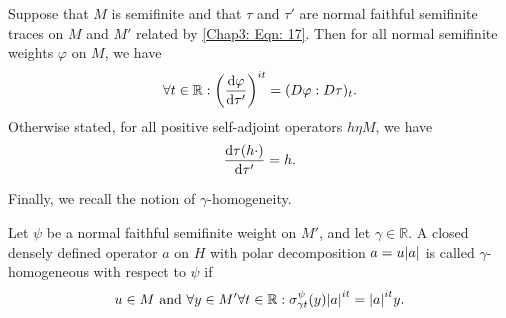 \begin{corollary}
    Suppose that $M$ is semifinite and that $\tau$ and $\tau'$ are normal faithful semifinite traces on $M$ and $M'$ related by \eqref{Chap3: Eqn: 17}. Then for all normal semifinite weights $\varphi$ on $M$, we have
    \[
        \forall t\in \mathbb{R}:\left( \dv{\varphi}{\tau'} \right)^{it}=(D\varphi:D\tau)_t.
    \]
    Otherwise stated, for all positive self-adjoint operators $h\eta M$, we have
    \[
        \dv{\tau(h\cdot)}{\tau'}=h.
    \]
\end{corollary}
Finally, we recall the notion of $\gamma$-homogeneity.
\begin{definition}
    Let $\psi$ be a normal faithful semifinite weight on $M'$, and let $\gamma\in \mathbb{R}$. A closed densely defined operator $a$ on $H$ with polar decomposition $a=u\abs{a}$ is called $\gamma$-homogeneous with respect to $\psi$ if
    \begin{equation}
        u\in M \text{ and } \forall y\in M' \forall t\in \mathbb{R}: \sigma_{\gamma t}^\psi(y)\abs{a}^{it}=\abs{a}^{it}y.
    \end{equation}
\end{definition}
% 